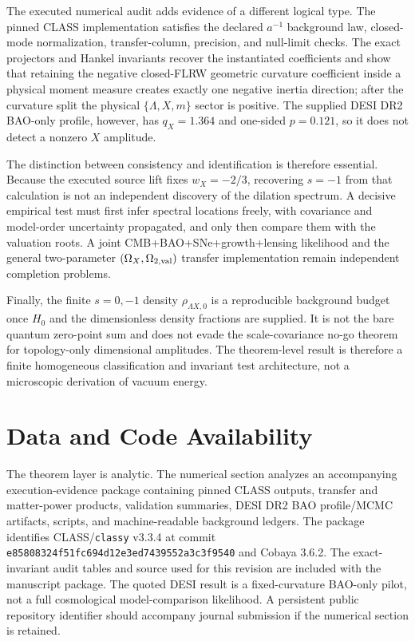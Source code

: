 \documentclass[aps,prd,reprint,onecolumn,nofootinbib,superscriptaddress,showkeys]{revtex4-2}
\numberwithin{equation}{section}
\theoremstyle{definition}
\theoremstyle{plain}
\begin{document}
The executed numerical audit adds evidence of a different logical type.  The pinned CLASS implementation satisfies the declared \(a^{-1}\) background law, closed-mode normalization, transfer-column, precision, and null-limit checks.  The exact projectors and Hankel invariants recover the instantiated coefficients and show that retaining the negative closed-FLRW geometric curvature coefficient inside a physical moment measure creates exactly one negative inertia direction; after the curvature split the physical \(\{\Lambda,X,m\}\) sector is positive.  The supplied DESI DR2 BAO-only profile, however, has \(q_X=1.364\) and one-sided \(p=0.121\), so it does not detect a nonzero \(X\) amplitude.

The distinction between consistency and identification is therefore essential.  Because the executed source lift fixes \(w_X=-2/3\), recovering \(s=-1\) from that calculation is not an independent discovery of the dilation spectrum.  A decisive empirical test must first infer spectral locations freely, with covariance and model-order uncertainty propagated, and only then compare them with the valuation roots.  A joint CMB+BAO+SNe+growth+lensing likelihood and the general two-parameter \((\Omega_X,\Omega_{2,{\rm val}})\) transfer implementation remain independent completion problems.

Finally, the finite \(s=0,-1\) density \(\rho_{\Lambda X,0}\) is a reproducible background budget once \(H_0\) and the dimensionless density fractions are supplied.  It is not the bare quantum zero-point sum and does not evade the scale-covariance no-go theorem for topology-only dimensional amplitudes.  The theorem-level result is therefore a finite homogeneous classification and invariant test architecture, not a microscopic derivation of vacuum energy.


\section*{Data and Code Availability}

The theorem layer is analytic.  The numerical section analyzes an accompanying execution-evidence package containing pinned CLASS outputs, transfer and matter-power products, validation summaries, DESI DR2 BAO profile/MCMC artifacts, scripts, and machine-readable background ledgers.  The package identifies CLASS/\texttt{classy} v3.3.4 at commit \texttt{e85808324f51fc694d12e3ed7439552a3c3f9540} and Cobaya 3.6.2.  The exact-invariant audit tables and source used for this revision are included with the manuscript package.  The quoted DESI result is a fixed-curvature BAO-only pilot, not a full cosmological model-comparison likelihood.  A persistent public repository identifier should accompany journal submission if the numerical section is retained.
\end{document}

